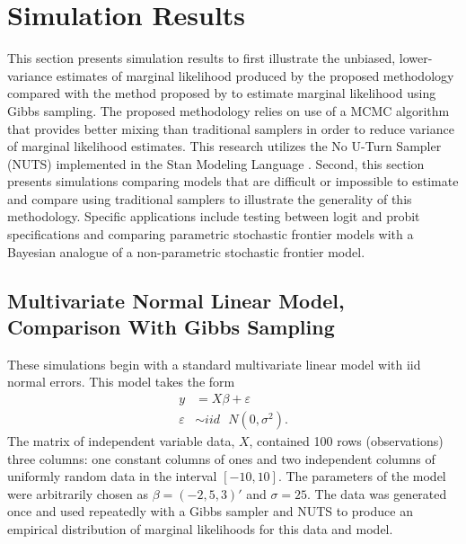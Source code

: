 \documentclass[twocolumn]{article}
\newcommand{\ep}{\varepsilon}
\begin{document}
\section{Simulation Results}

This section presents simulation results to first illustrate the unbiased, lower-variance estimates of marginal likelihood produced by the proposed methodology compared with the method proposed by \cite{Chib} to estimate marginal likelihood using Gibbs sampling. The proposed methodology relies on use of a MCMC algorithm that provides better mixing than traditional samplers in order to reduce variance of marginal likelihood estimates. This research utilizes the No U-Turn Sampler (NUTS) implemented in the Stan Modeling Language \citep{rstan}. Second, this section presents simulations comparing models that are difficult or impossible to estimate and compare using traditional samplers to illustrate the generality of this methodology. Specific applications include testing between logit and probit specifications and comparing parametric stochastic frontier models with a Bayesian analogue of a non-parametric stochastic frontier model.

\subsection{Multivariate Normal Linear Model, Comparison With Gibbs Sampling}



These simulations begin with a standard multivariate linear model with iid normal errors. This model takes the form
\begin{subequations}
\begin{align}
	y &= X\beta + \ep \\
	\ep &\sim iid \mbox{ }N(0, \sigma^2). 
\end{align}
\end{subequations}
The matrix of independent variable data, $X$, contained 100 rows (observations) three columns: one constant columns of ones and two independent columns of uniformly random data in the interval $[-10, 10]$. The parameters of the model were arbitrarily chosen as $\beta = (-2, 5, 3)'$ and $\sigma = 25$. The data was generated once and used repeatedly with a Gibbs sampler and NUTS to produce an empirical distribution of marginal likelihoods for this data and model.
\end{document}
